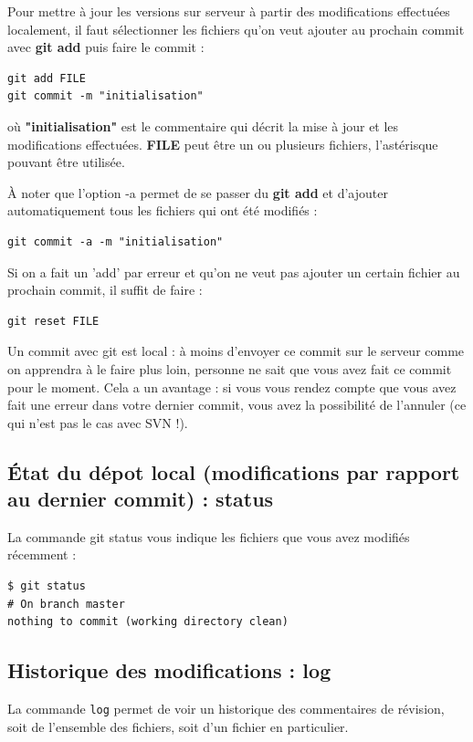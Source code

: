 \documentclass[a4paper,twoside]{article}
\begin{document}
Pour mettre à jour les versions sur serveur à partir des modifications effectuées localement, il faut sélectionner les fichiers qu'on veut ajouter au prochain commit avec \textbf{git add} puis faire le commit :
\begin{verbatim}
git add FILE
git commit -m "initialisation"
\end{verbatim}
où \textbf{"initialisation"} est le commentaire qui décrit la mise à jour et les modifications effectuées. \textbf{FILE} peut être un ou plusieurs fichiers, l'astérisque pouvant être utilisée.

À noter que l'option -a permet de se passer du \textbf{git add} et d'ajouter automatiquement tous les fichiers qui ont été modifiés :
 \begin{verbatim}
git commit -a -m "initialisation"
\end{verbatim}

\begin{remarque}
Si on a fait un 'add' par erreur et qu'on ne veut pas ajouter un certain fichier au prochain commit, il suffit de faire :
\begin{verbatim}
git reset FILE
\end{verbatim}
\end{remarque}

\bigskip

\begin{attention}
Un commit avec git est local : à moins d'envoyer ce commit sur le serveur comme on apprendra à le faire plus loin, personne ne sait que vous avez fait ce commit pour le moment. Cela a un avantage : si vous vous rendez compte que vous avez fait une erreur dans votre dernier commit, vous avez la possibilité de l'annuler (ce qui n'est pas le cas avec SVN !).
\end{attention}

\subsection{État du dépot local (modifications par rapport au dernier commit) : status}
La commande git status vous indique les fichiers que vous avez modifiés récemment :
\begin{verbatim}
$ git status
# On branch master
nothing to commit (working directory clean)
\end{verbatim}

\subsection{Historique des modifications : log}
La commande \texttt{log} permet de voir un historique des commentaires de révision, soit de l'ensemble des fichiers, soit d'un fichier en particulier.
\end{document}

